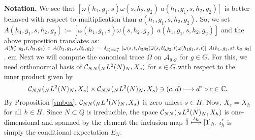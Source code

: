 \noindent \textbf{Notation.} We see that $ \left[ \omega (h_1 , g_1 , s) \omega (s, h_2, g_2) \; a(h_1 , g_1 , s , h_2 , g_2)\right] $ is better behaved with respect to multiplication than $ a(h_1 , g_1 , s , h_2 , g_2)$.
So, we set\\
$ A(h_1 , g_1 , s , h_2 , g_2) := \left[ \omega (h_1 , g_1 , s) \omega (s, h_2, g_2) \; a(h_1 , g_1 , s , h_2 , g_2)\right] $ and the above proposition translates as:\\
$A(h''_2 , g_2 , t , h_3 , g_3) \; \circ \; A(h_1 , g_1 , s , h'_2 , g_2) \; =  \; \delta_{h'_2 = h''_2} \; \left[ \omega (s,t,h_3g_3) \overline{\omega} (s, h'_2 g_2, t)   \omega (h_1g_1 , s, t)    \right] \; A(h_1 , g_1 , st , h_3 , g_3)$.
 em
Next we will compute the canonical trace $ \Omega $ on $ \mathcal A_{g,g} $ for $ g\in G $.
For this, we need orthonormal basis of $ \mathcal C_{NN}  ( {}_N L^2 (N) {}_N , X_s) $ for $ s \in G $ with respect to the inner product given by
\[
 \mathcal C_{NN}  ( {}_N L^2 (N) {}_N , X_s)  \times  \mathcal C_{NN}  ( {}_N L^2 (N) {}_N , X_s)  \ni (c,d) \longmapsto d^* \circ c \in \mathbb{C}.
\]
By Proposition \ref{smbox}, $ \mathcal C_{NN}  ( {}_N L^2 (N) {}_N , X_s) $ is zero unless $ s \in H $.
Now, $ X_e = X_h $ for all $ h\in H $.
Since $ N \subset Q $ is irreducible, the space $  \mathcal C_{NN}  ( {}_N L^2 (N) {}_N , X_h)  $  is one-dimensional and spanned by the element the inclusion map $ \hat 1 \overset{\displaystyle {\iota_h}}{\longmapsto} [1]_h $.
$ \iota^*_h $ is simply the conditional expectation $ E_N $.


